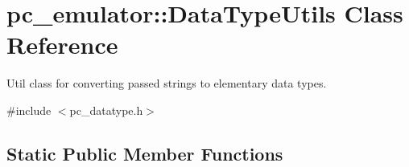 \hypertarget{classpc__emulator_1_1DataTypeUtils}{}\section{pc\+\_\+emulator\+:\+:Data\+Type\+Utils Class Reference}
\label{classpc__emulator_1_1DataTypeUtils}


Util class for converting passed strings to elementary data types.  




{\ttfamily \#include $<$pc\+\_\+datatype.\+h$>$}

\subsection*{Static Public Member Functions}
